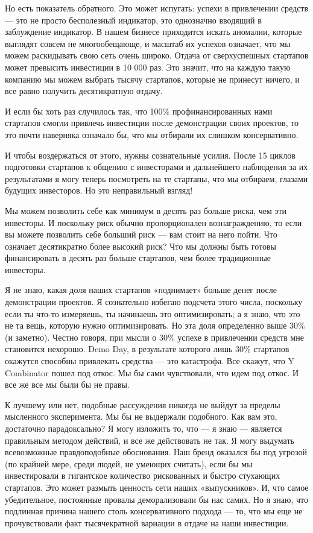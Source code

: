 \documentclass[ebook,12pt,oneside,openany]{memoir}
\begin{document}
Но есть показатель обратного. Это может испугать: успехи в привлечении
средств — это не просто бесполезный индикатор, это однозначно вводящий
в заблуждение индикатор. В нашем бизнесе приходится искать аномалии,
которые выглядят совсем не многообещающе, и масштаб их успехов
означает, что мы можем раскидывать свою сеть очень широко. Отдача от
сверхуспешных стартапов может превысить инвестиции в 10 000 раз. Это
значит, что на каждую такую компанию мы можем выбрать тысячу
стартапов, которые не принесут ничего, и все равно получить
десятикратную отдачу. \newline

И если бы хоть раз случилось так, что 100\% профинансированных нами
стартапов смогли привлечь инвестиции после демонстрации своих
проектов, то это почти наверняка означало бы, что мы отбирали их
слишком консервативно. \newline

И чтобы воздержаться от этого, нужны сознательные усилия. После 15
циклов подготовки стартапов к общению с инвесторами и дальнейшего
наблюдения за их результатами я могу теперь посмотреть на те стартапы,
что мы отбираем, глазами будущих инвесторов. Но это неправильный
взгляд! \newline

Мы можем позволить себе как минимум в десять раз больше риска, чем эти
инвесторы. И поскольку риск обычно пропорционален вознаграждению, то
если вы можете позволить себе больший риск — вам стоит на него пойти.
Что означает десятикратно более высокий риск? Что мы должны быть
готовы финансировать в десять раз больше стартапов, чем более
традиционные инвесторы. \newline

Я не знаю, какая доля наших стартапов «поднимает» больше денег после
демонстрации проектов. Я сознательно избегаю подсчета этого числа,
поскольку если ты что-то измеряешь, ты начинаешь это оптимизировать; а
я знаю, что это не та вещь, которую нужно оптимизировать. Но эта доля
определенно выше 30\% (и заметно). Честно говоря, при мысли о 30\%
успехе в привлечении средств мне становится нехорошо. Demo Day, в
результате которого лишь 30\% стартапов окажутся способны привлекать
средства — это катастрофа. Все скажут, что Y Combinator пошел под
откос. Мы бы сами чувствовали, что идем под откос. И все же все мы
были бы не правы. \newline

К лучшему или нет, подобные рассуждения никогда не выйдут за пределы
мысленного эксперимента. Мы бы не выдержали подобного. Как вам это,
достаточно парадоксально? Я могу изложить то, что — я знаю — является
правильным методом действий, и все же действовать не так. Я могу
выдумать всевозможные правдоподобные обоснования. Наш бренд оказался
бы под угрозой (по крайней мере, среди людей, не умеющих считать),
если бы мы инвестировали в гигантское количество рискованных и быстро
стухающих стартапов. Это может размыть ценность сети наших
«выпускников». И, что самое убедительное, постоянные провалы
деморализовали бы нас самих. Но я знаю, что подлинная причина нашего
столь консервативного подхода — то, что мы еще не прочувствовали факт
тысячекратной вариации в отдаче на наши инвестиции. \newline
\end{document}
